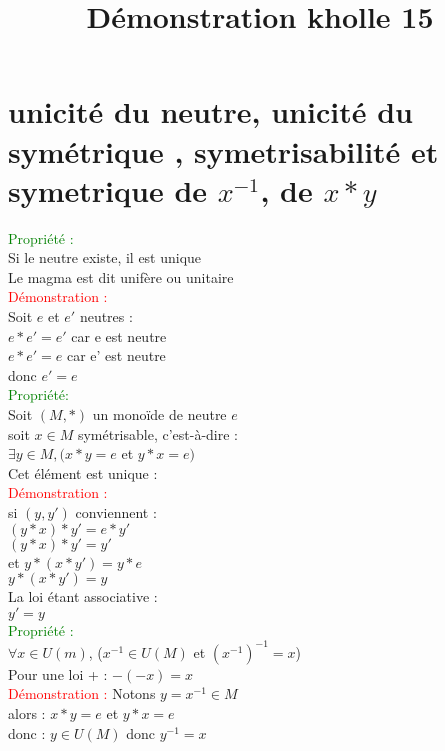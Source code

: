 \documentclass{article}
\begin{document}
\title{Démonstration kholle 15}
\date{}
\maketitle
	\renewcommand{\thesection}{\Roman{section}}
	\setlength{\parindent}{1.5cm}
	\section{unicité du neutre, unicité du symétrique , symetrisabilité et symetrique de $x^{-1}$, de $x \ast y$}
	\textcolor{green}{Propriété :} \\
	Si le neutre existe, il est unique \\
	Le magma est dit unif\`ere ou unitaire \\
	\textcolor{red}{Démonstration :} \\
	Soit $e$ et $e'$ neutres : \\
	$e \ast e' = e'$ car e est neutre \\
	$e \ast e' = e$ car e' est neutre \\
	donc $e'=e$ \\
	\textcolor{green}{Propriété:} \\ 
	Soit $(M,\ast)$ un monoïde de neutre $e$ \\ 
	soit $x \in M$ symétrisable, c'est-à-dire : \\ 
	$\exists y \in M ,(x \ast y =e$ et $y \ast x =e)$ \\ 
	Cet élément est unique : \\ 
	\textcolor{red}{Démonstration :} \\ 
	si $(y,y')$ conviennent : \\ 
	$(y \ast x) \ast y'= e \ast y' $ \\ 
	$(y \ast x) \ast y'= y' $ \\ 
	et $y \ast (x \ast y')= y \ast e$ \\ 
	$y \ast (x \ast y')= y$ \\ 
	La loi étant associative : \\ 
	$y'=y$ \\ 
	\textcolor{green}{Propriété :} \\
     $\forall x \in U(m)$, ($x^{-1} \in U(M)$ et $(x^{-1})^{-1}=x$) \\
	Pour une loi + : $-(-x)=x$ \\
	\textcolor{red}{Démonstration :} Notons $y =x^{-1} \in M$ \\
	 alors : $ x \ast y = e$ et $ y \ast x = e $ \\
	 donc : $y \in U(M)$ donc $y^{-1}=x$ \\
\end{document}
